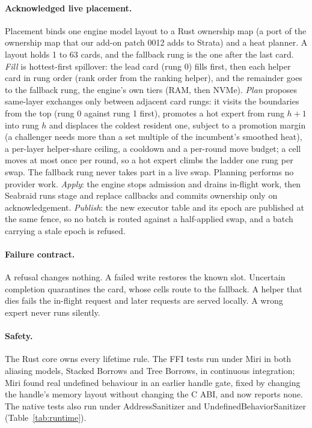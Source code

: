 \documentclass[11pt]{article}
\newcommand{\product}{Seabraid}                 %
\begin{document}
\paragraph{Acknowledged live placement.} Placement binds one engine model layout to a Rust ownership map (a port of
the ownership map that our add-on patch 0012 adds to Strata) and a heat planner.
A layout holds 1 to 63 cards, and the fallback rung is the one after the last card.
\emph{Fill} is hottest-first spillover: the lead card (rung 0) fills first, then each helper card in rung order (rank
order from the ranking helper), and the remainder goes to the fallback rung, the engine's own tiers (RAM, then NVMe).
\emph{Plan} proposes same-layer exchanges only between adjacent card rungs: it visits the boundaries from the top
(rung 0 against rung 1 first), promotes a hot expert from rung $h+1$ into rung $h$ and displaces the coldest resident
one, subject to a promotion margin (a challenger needs more than a set multiple of the incumbent's smoothed heat), a
per-layer helper-share ceiling, a cooldown and a per-round move budget; a cell moves at most once per round, so a hot
expert climbs the ladder one rung per swap. The fallback rung never takes part in a live swap. Planning performs no
provider work. \emph{Apply}: the engine stops admission and drains
in-flight work, then \product{} runs stage and replace callbacks and commits ownership only on acknowledgement.
\emph{Publish}: the new executor table and its epoch are published at the same fence, so no batch is routed against a
half-applied swap, and a batch carrying a stale epoch is refused.

\paragraph{Failure contract.} A refusal changes nothing. A failed write restores the known slot. Uncertain completion
quarantines the card, whose cells route to the fallback. A helper that dies fails the in-flight request and later
requests are served locally. A wrong expert never runs silently.

\paragraph{Safety.} The Rust core owns every lifetime rule. The FFI tests run under Miri in both aliasing models,
Stacked Borrows and Tree Borrows, in continuous integration; Miri found real undefined behaviour in an earlier handle
gate, fixed by changing the handle's memory layout without changing the C ABI, and now reports none. The native tests also run
under AddressSanitizer and UndefinedBehaviorSanitizer (Table~\ref{tab:runtime}).
\end{document}
